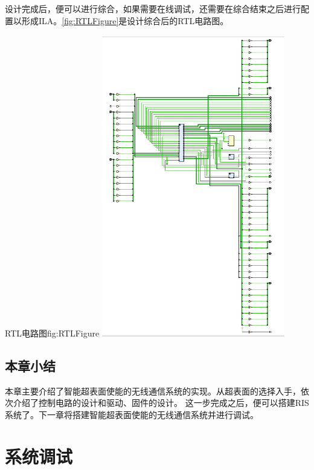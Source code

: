 \documentclass[supercite]{HustGraduPaper}
\begin{document}

设计完成后，便可以进行综合，如果需要在线调试，还需要在综合结束之后进行配置以形成ILA。\autoref{fig:RTLFigure}是设计综合后的RTL电路图。

\begin{generalfig}[htb]{RTL电路图}{fig:RTLFigure}
	\includegraphics[width=8cm]{Figures/RTLFigure.png}
\end{generalfig}



\subsection{本章小结}

本章主要介绍了智能超表面使能的无线通信系统的实现。从超表面的选择入手，依次介绍了控制电路的设计和驱动、固件的设计。
这一步完成之后，便可以搭建RIS系统了。下一章将搭建智能超表面使能的无线通信系统并进行调试。

\section{系统调试}
\end{document}

